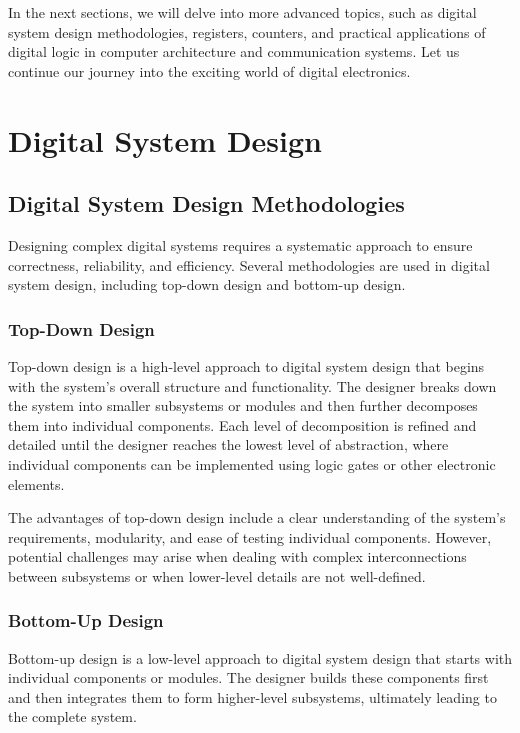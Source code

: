 \documentclass{article}
\begin{document}
In the next sections, we will delve into more advanced topics, such as digital system design methodologies, registers, counters, and practical applications of digital logic in computer architecture and communication systems. Let us continue our journey into the exciting world of digital electronics.

\newpage

\section{Digital System Design}

\subsection{Digital System Design Methodologies}

Designing complex digital systems requires a systematic approach to ensure correctness, reliability, and efficiency. Several methodologies are used in digital system design, including top-down design and bottom-up design.

\subsubsection{Top-Down Design}

Top-down design is a high-level approach to digital system design that begins with the system's overall structure and functionality. The designer breaks down the system into smaller subsystems or modules and then further decomposes them into individual components. Each level of decomposition is refined and detailed until the designer reaches the lowest level of abstraction, where individual components can be implemented using logic gates or other electronic elements.

The advantages of top-down design include a clear understanding of the system's requirements, modularity, and ease of testing individual components. However, potential challenges may arise when dealing with complex interconnections between subsystems or when lower-level details are not well-defined.

\subsubsection{Bottom-Up Design}

Bottom-up design is a low-level approach to digital system design that starts with individual components or modules. The designer builds these components first and then integrates them to form higher-level subsystems, ultimately leading to the complete system.
\end{document}
